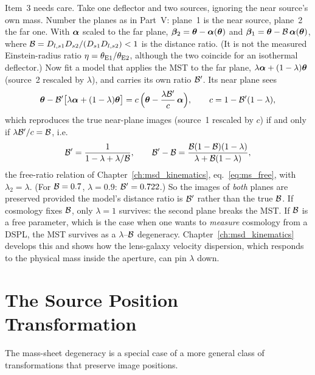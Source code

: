 \begin{bridge}
Item~3 needs care.  Take one deflector and two sources, ignoring the near
source's own mass.  Number the planes as in Part~V: plane~1 is the near
source, plane~2 the far one.  With $\boldsymbol{\alpha}$ scaled to the far plane,
$\boldsymbol{\beta}_2 = \boldsymbol{\theta} - \boldsymbol{\alpha}(\boldsymbol{\theta})$ and
$\boldsymbol{\beta}_1 = \boldsymbol{\theta} - \mathcal{B}\,\boldsymbol{\alpha}(\boldsymbol{\theta})$, where
$\mathcal{B} = D_{l,s1}D_{s2}/(D_{s1}D_{l,s2}) < 1$ is the distance ratio.  (It is
not the measured Einstein-radius ratio $\eta = \theta_{\mathrm{E}1}/\theta_{\mathrm{E}2}$,
although the two coincide for an isothermal deflector.)  Now fit a model
that applies the MST to the far plane, $\lambda\boldsymbol{\alpha} + (1-\lambda)\boldsymbol{\theta}$
(source~2 rescaled by $\lambda$), and carries its own ratio $\mathcal{B}'$.  Its
near plane sees
\[
  \boldsymbol{\theta} - \mathcal{B}'\big[\lambda\boldsymbol{\alpha} + (1-\lambda)\boldsymbol{\theta}\big]
  = c\,\Big(\boldsymbol{\theta} - \frac{\lambda\mathcal{B}'}{c}\,\boldsymbol{\alpha}\Big),
  \qquad c = 1 - \mathcal{B}'(1-\lambda),
\]
which reproduces the true near-plane images (source~1 rescaled by $c$) if and
only if $\lambda\mathcal{B}'/c = \mathcal{B}$, i.e.
\[
  \mathcal{B}' = \frac{1}{1-\lambda+\lambda/\mathcal{B}},
  \qquad
  \mathcal{B}' - \mathcal{B} = \frac{\mathcal{B}(1-\mathcal{B})(1-\lambda)}{\lambda + \mathcal{B}(1-\lambda)},
\]
the free-ratio relation of Chapter~\ref{ch:msd_kinematics},
eq.~\eqref{eq:ms_free}, with $\lambda_2 = \lambda$.  (For $\mathcal{B} = 0.7$,
$\lambda = 0.9$: $\mathcal{B}' = 0.722$.)  So the images of \emph{both} planes are
preserved provided the model's distance ratio is $\mathcal{B}'$ rather than the
true $\mathcal{B}$.  If cosmology fixes $\mathcal{B}$, only $\lambda = 1$ survives: the
second plane breaks the MST.  If $\mathcal{B}$ is a free parameter, which is the
case when one wants to \emph{measure} cosmology from a DSPL, the MST survives
as a $\lambda$--$\mathcal{B}$ degeneracy.
Chapter~\ref{ch:msd_kinematics} develops this and shows how the lens-galaxy
velocity dispersion, which responds to the physical mass inside the aperture,
can pin $\lambda$ down.
\end{bridge}



\section{The Source Position Transformation}
\label{sec:spt}

The mass-sheet degeneracy is a special case of a more general class
of transformations that preserve image positions.

